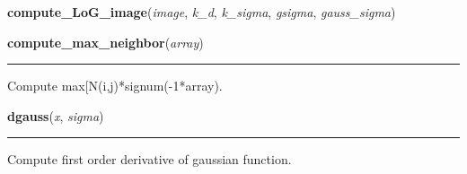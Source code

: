     \label{multireg:edge_detect:compute_LoG_image}
    \vspace{0.5ex}

    \begin{boxedminipage}{\textwidth}

    \raggedright \textbf{compute\_LoG\_image}(\textit{image}, \textit{k\_d}, \textit{k\_sigma}, \textit{gsigma}, \textit{gauss\_sigma})

    \end{boxedminipage}

    \label{multireg:edge_detect:compute_max_neighbor}
    \vspace{0.5ex}

    \begin{boxedminipage}{\textwidth}

    \raggedright \textbf{compute\_max\_neighbor}(\textit{array})

    \vspace{-1.5ex}

    \rule{\textwidth}{0.5\fboxrule}
    Compute max[N(i,j)*signum(-1*array).

    \vspace{1ex}

    \end{boxedminipage}

    \label{multireg:edge_detect:dgauss}
    \vspace{0.5ex}

    \begin{boxedminipage}{\textwidth}

    \raggedright \textbf{dgauss}(\textit{x}, \textit{sigma})

    \vspace{-1.5ex}

    \rule{\textwidth}{0.5\fboxrule}
    Compute first order derivative of gaussian function.

    \vspace{1ex}

    \end{boxedminipage}

    \label{multireg:edge_detect:find_edge_points}
    \vspace{0.5ex}

